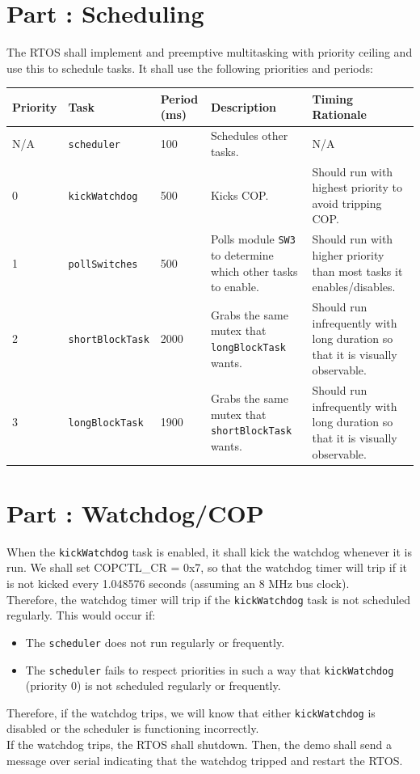 \documentclass{article}
\newcounter{partNum}
\newcommand{\partNum}{%
        \stepcounter{partNum}%
        \thepartNum}
\newcommand{\sectPart}[1]{\section*{Part \partNum: #1}}
\begin{document}

\sectPart{Scheduling}

The RTOS shall implement and preemptive multitasking with priority ceiling and use this to schedule tasks. It shall use the following priorities and periods:

\vspace{1em}

\begin{center}
    \begin{tabular}{|l|l|l|p{10em}|p{10em}|}
        \hline
        \textbf{Priority} & \textbf{Task} & \textbf{Period (ms)} & \textbf{Description} & \textbf{Timing Rationale} \\ \hline
        N/A & \texttt{scheduler} & 100 & Schedules other tasks. & N/A \\ \hline
        0 & \texttt{kickWatchdog} & 500 & Kicks COP. & Should run with highest priority to avoid tripping COP. \\ \hline
        1 & \texttt{pollSwitches} & 500 & Polls module \texttt{SW3} to determine which other tasks to enable. & Should run with higher priority than most tasks it enables/disables. \\ \hline
        2 & \texttt{shortBlockTask} & 2000 & Grabs the same mutex that \texttt{longBlockTask} wants. & Should run infrequently with long duration so that it is visually observable. \\ \hline
        3 & \texttt{longBlockTask} & 1900 & Grabs the same mutex that \texttt{shortBlockTask} wants. & Should run infrequently with long duration so that it is visually observable. \\ \hline
    \end{tabular}
\end{center}


\newpage

\sectPart{Watchdog/COP}

When the \texttt{kickWatchdog} task is enabled, it shall kick the watchdog whenever it is run. We shall set COPCTL\_CR = 0x7, so that the watchdog timer will trip if it is not kicked every 1.048576 seconds (assuming an 8 MHz bus clock). \\
Therefore, the watchdog timer will trip if the \texttt{kickWatchdog} task is not scheduled regularly. This would occur if:
    \begin{itemize}
        \item The \texttt{scheduler} does not run regularly or frequently.
        \item The \texttt{scheduler} fails to respect priorities in such a way that \texttt{kickWatchdog} (priority 0) is not scheduled regularly or frequently.
    \end{itemize}
Therefore, if the watchdog trips, we will know that either \texttt{kickWatchdog} is disabled or the scheduler is functioning incorrectly. \\
If the watchdog trips, the RTOS shall shutdown. Then, the demo shall send a message over serial indicating that the watchdog tripped and restart the RTOS.
\end{document}
